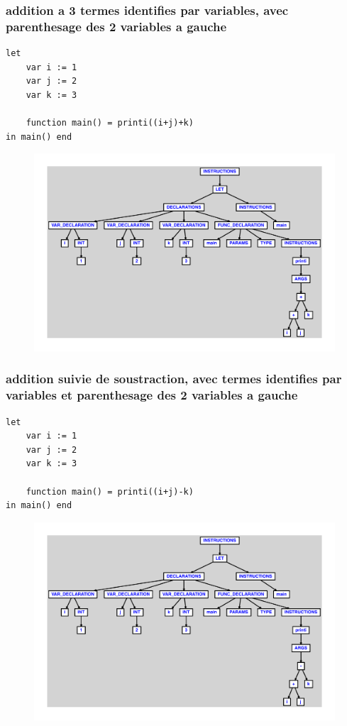 \documentclass{article}
\begin{document}
\subsubsection{addition a 3 termes identifies par variables, avec parenthesage des 2 variables a gauche}
\begin{lstlisting}
let
	var i := 1
	var j := 2
	var k := 3

	function main() = printi((i+j)+k)
in main() end
\end{lstlisting}
\newpage
\begin{figure}[H]
\centering
\includegraphics[max width=\textwidth]{ast/ast_119.pdf}
\end{figure}
\newpage
\subsubsection{addition suivie de soustraction, avec termes identifies par variables et parenthesage des 2 variables a gauche}
\begin{lstlisting}
let
	var i := 1
	var j := 2
	var k := 3

	function main() = printi((i+j)-k)
in main() end
\end{lstlisting}
\newpage
\begin{figure}[H]
\centering
\includegraphics[max width=\textwidth]{ast/ast_120.pdf}
\end{figure}
\newpage
\end{document}
